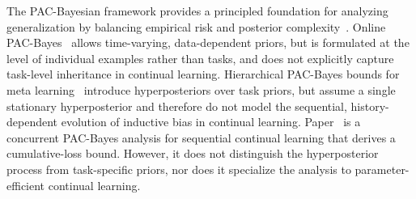 \documentclass[10pt]{article} %
\newcommand{\minisection}[1]{\vspace{0.04in}\noindent{\bf #1}}
\begin{document}

\minisection{PAC-Bayesian Theory.}
The PAC-Bayesian framework provides a principled foundation for analyzing generalization by balancing empirical risk and posterior complexity~\cite{mcallesterPACBayesianModelAveraging1999,mcallesterPACBayesianStochasticModel2003,pentinaPACBayesianBoundLifelong2014,germainPACBayesianTheoryMeets2016,lotfiPACBayesCompressionBounds2022}.
Online PAC-Bayes~\citep{NEURIPS2022_onlineBayes,NEURIPS2024_xinrui} allows time-varying, data-dependent priors, but is formulated at the level of individual examples rather than tasks, and does not explicitly capture task-level inheritance in continual learning.
Hierarchical PAC-Bayes bounds for meta learning~\citep{pentinaPACBayesianBoundLifelong2014,JMLR:v24:22-1254} introduce hyperposteriors over task priors, but assume a single stationary hyperposterior and therefore do not model the sequential, history-dependent evolution of inductive bias in continual learning.
Paper~\cite{friedman2026pac} is a concurrent PAC-Bayes analysis for sequential continual learning that derives a cumulative-loss bound. However, it does not distinguish the hyperposterior process from task-specific priors, nor does it specialize the analysis to parameter-efficient continual learning.
\end{document}
